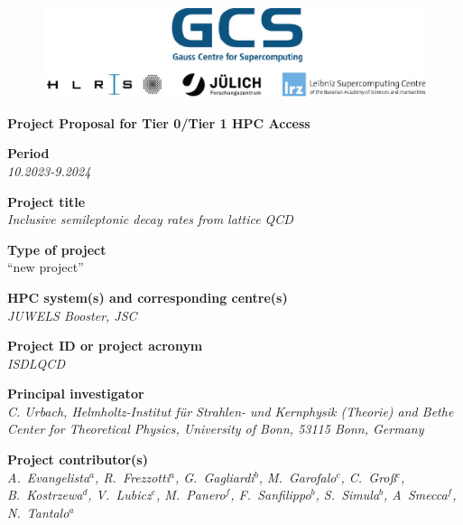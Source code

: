 \documentclass [a4paper, 11pt]{article}
\begin{document}
 
\begin{figure}[H]
\begin{center}
  \includegraphics[scale=0.45]{Figures/GCS-hlrs-fzj-lrz.jpg}\\
\end{center}
\end{figure}

\begin{center}
{\LARGE \bf Project Proposal for Tier 0/Tier 1 HPC Access} \\

\bigskip
\bigskip
\bigskip
\end{center}
\textbf{Period}\\
\phantom{MM}\textit{10.2023-9.2024}

\bigskip
\textbf{Project title}\\
\phantom{MM}\textit{Inclusive semileptonic decay rates from lattice QCD}

\bigskip
\textbf{Type of project}\\
\phantom{MM} ``new project''

\bigskip
\textbf{HPC system(s) and corresponding centre(s)}\\
\phantom{MM} \textit{JUWELS Booster, JSC}

\bigskip
\textbf{Project ID or project acronym}\\
\phantom{MM} \textit{ISDLQCD}%

\bigskip
\textbf{Principal investigator}\\
\phantom{MM} \textit{C. Urbach, Helmholtz-Institut für Strahlen- und Kernphysik (Theorie) and
	Bethe Center for Theoretical Physics, University of Bonn, 53115 Bonn, Germany}

\bigskip
\textbf{Project contributor(s)}\\
\phantom{MM} \textit{ 
 A.~Evangelista$^a$,
 R.~Frezzotti$^a$,
 G.~Gagliardi$^b$,
 M.~Garofalo$^c$,
 C.~Groß$^c$,
 B.~Kostrzewa$^d$,
 V.~Lubicz$^e$,
 M.~Panero$^f$,
 F.~Sanfilippo$^b$,
 S.~Simula$^b$,
 A~Smecca$^f$,
 N.~Tantalo$^a$
}\\ 
\end{document}
